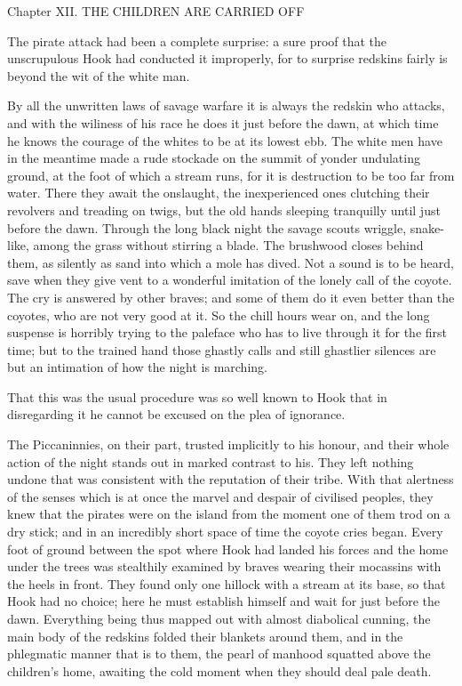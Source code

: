 Chapter XII.
THE CHILDREN ARE CARRIED OFF


The pirate attack had been a complete surprise: a sure proof that the
unscrupulous Hook had conducted it improperly, for to surprise redskins
fairly is beyond the wit of the white man.

By all the unwritten laws of savage warfare it is always the redskin
who attacks, and with the wiliness of his race he does it just before
the dawn, at which time he knows the courage of the whites to be at its
lowest ebb. The white men have in the meantime made a rude stockade on
the summit of yonder undulating ground, at the foot of which a stream
runs, for it is destruction to be too far from water. There they await
the onslaught, the inexperienced ones clutching their revolvers and
treading on twigs, but the old hands sleeping tranquilly until just
before the dawn. Through the long black night the savage scouts
wriggle, snake-like, among the grass without stirring a blade. The
brushwood closes behind them, as silently as sand into which a mole has
dived. Not a sound is to be heard, save when they give vent to a
wonderful imitation of the lonely call of the coyote. The cry is
answered by other braves; and some of them do it even better than the
coyotes, who are not very good at it. So the chill hours wear on, and
the long suspense is horribly trying to the paleface who has to live
through it for the first time; but to the trained hand those ghastly
calls and still ghastlier silences are but an intimation of how the
night is marching.

That this was the usual procedure was so well known to Hook that in
disregarding it he cannot be excused on the plea of ignorance.

The Piccaninnies, on their part, trusted implicitly to his honour, and
their whole action of the night stands out in marked contrast to his.
They left nothing undone that was consistent with the reputation of
their tribe. With that alertness of the senses which is at once the
marvel and despair of civilised peoples, they knew that the pirates
were on the island from the moment one of them trod on a dry stick; and
in an incredibly short space of time the coyote cries began. Every foot
of ground between the spot where Hook had landed his forces and the
home under the trees was stealthily examined by braves wearing their
mocassins with the heels in front. They found only one hillock with a
stream at its base, so that Hook had no choice; here he must establish
himself and wait for just before the dawn. Everything being thus mapped
out with almost diabolical cunning, the main body of the redskins
folded their blankets around them, and in the phlegmatic manner that is
to them, the pearl of manhood squatted above the children's home,
awaiting the cold moment when they should deal pale death.

